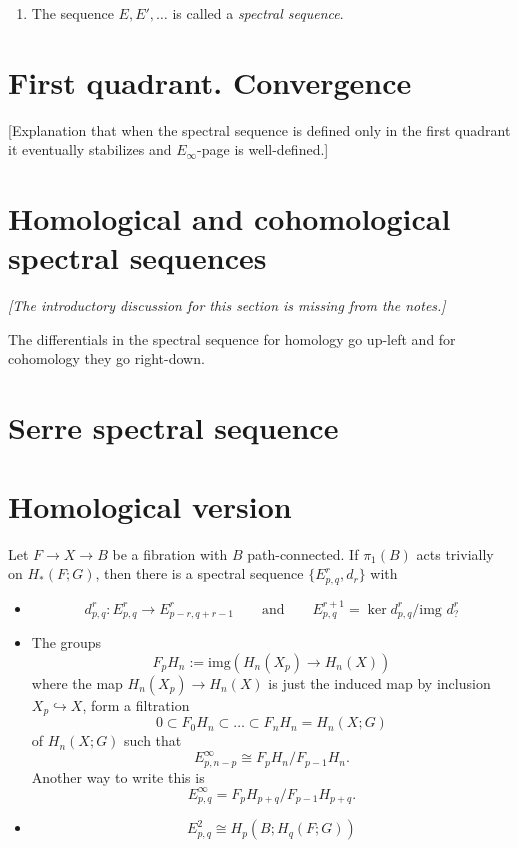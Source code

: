 \begin{enumerate}
	\item The sequence $E,E',\ldots$ is called a
	{\it spectral sequence}.
\end{enumerate}

\section{First quadrant. Convergence}
\label{section-first-quadrant-convergence}

[Explanation that when the spectral sequence
is defined only in the first quadrant it
eventually stabilizes and $E_{\infty}$-page
is well-defined.]

\section{Homological and cohomological
spectral sequences}
\label{section-homol-cohom-spect-seque}

\noindent
\emph{[The introductory discussion for this section is missing from
the notes.]}

\begin{remark}
\label{remark-diffe-spect-seque-homol-go}
	The differentials in the spectral sequence
	for homology go up-left and for cohomology
	they go right-down.
\end{remark}

\section{Serre spectral sequence}
\label{section-serre-spectral-sequence}

\section{Homological version}
\label{section-homological-version}

\begin{theorem}
\label{theorem-serre-spect-seque-homol}
	Let $F\to X\to B$ be a fibration with $B$
	path-connected. If $\pi_1(B)$ acts trivially
	on $H_*(F;G)$, then there is a spectral
	sequence $\{E^r_{p,q},d_r\}$ with
	\begin{itemize}
		\item
			$$d^r_{p,q}:E^r_{p,q}\to
			E^r_{p-r,q+r-1}\qquad \text{and} \qquad
			E^{r+1}_{p,q}=\ker d^r_{p,q}/\text{img
			}d^r_{?}$$
		\item The groups
			$$F_pH_n:=\text{img}(H_n(X_p)\to H_n(X))$$
		where the map $H_{n}(X_p)\to H_{n}(X)$ is
		just the induced map by inclusion
		$X_p\hookrightarrow X$, form a filtration
		$$0\subset F_0H_n\subset \ldots\subset
		F_nH_n=H_n(X;G)$$
		of $H_n(X;G)$ such that
		$$E^\infty_{p,n-p}\cong
		F_pH_n/F_{p-1}H_n.$$
		Another way to write this is
		$$E_{p,q}^\infty=F_pH_{p+q}\Big/F_{p-1}
		H_{p+q}.$$
	\item $$E^2_{p,q}\cong H_p(B;H_q(F;G))$$
\end{itemize}
\end{theorem}


